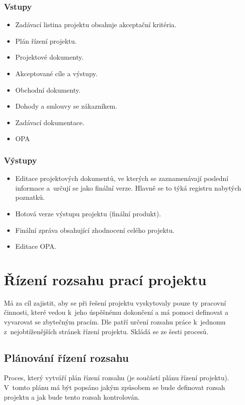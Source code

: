 \subsubsection*{Vstupy}
\begin{itemize}
    \item Zadávací listina projektu obsahuje akceptační kritéria.
    \item Plán řízení projektu.
    \item Projektové dokumenty.
    \item Akceptované cíle a výstupy.
    \item Obchodní dokumenty.
    \item Dohody a smlouvy se zákazníkem.
    \item Zadávací dokumentace.
    \item OPA
\end{itemize}
\subsubsection*{Výstupy}
\begin{itemize}
    \item Editace projektových dokumentů, ve kterých se zaznamenávají poslední informace a~určují se jako finální verze. Hlavně se to týká registru nabytých poznatků.
    \item Hotová verze výstupu projektu (finální produkt).
    \item Finální zpráva obsahující zhodnocení celého projektu.
    \item Editace OPA.
\end{itemize}

\section{Řízení rozsahu prací projektu}
\label{RizeniRozsahu}

Má za cíl zajistit, aby se při řešení projektu vyskytovaly pouze ty pracovní činnosti, které vedou k~jeho úspěšnému dokončení a má pomoci definovat a vyvarovat se zbytečným pracím. Dle \cite{StrategieRizeni} patří určení rozsahu práce k~jednomu z~nejobtíženějších stránek řízení projektu. Skládá se ze šesti procesů. 

\subsection*{Plánování řízení rozsahu}

Proces, který vytváří plán řízení rozsahu (je součástí plánu řízení projektu).  V~tomto plánu má být popsáno jakým způsobem se bude definovat rozsah projektu a jak bude tento rozsah kontrolován.

